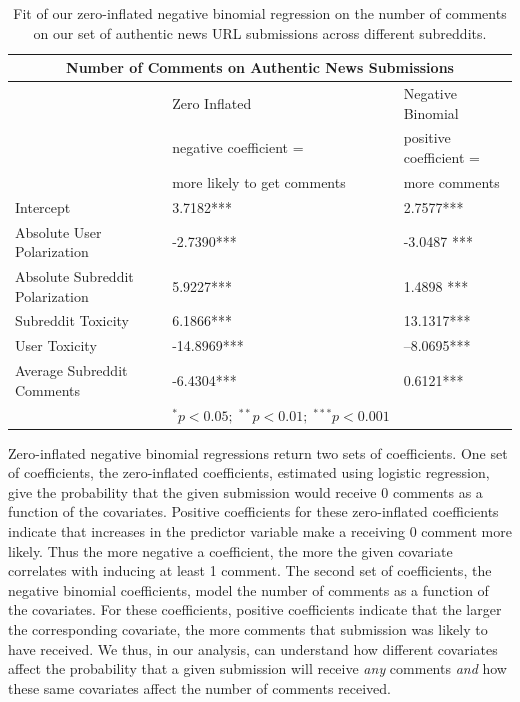 \begin{table}[b]
\centering
\begin{tabular}{lll}
\toprule
   \multicolumn{3}{c}{\large Number of Comments on Authentic News Submissions}          \\
   \toprule
                            & {Zero Inflated}  & {Negative Binomial }  \\
                      &       \footnotesize{negative coefficient = } &  \footnotesize{positive coefficient = }\\
                      &       \footnotesize{more likely to get comments} &  \footnotesize{more comments}\\
      \midrule
      Intercept              & 3.7182***  &2.7577*** \\               
      \midrule
     Absolute User Polarization               & -2.7390***  & -3.0487 ***  \\
      \midrule
      Absolute Subreddit Polarization              & 5.9227*** &1.4898 *** \\
    \midrule
      Subreddit Toxicity & 6.1866***  & 13.1317*** \\
      \midrule
       User Toxicity &   -14.8969*** &  --8.0695***\\
      \midrule
      Average Subreddit Comments &  -6.4304*** & 0.6121***  \\
\bottomrule
& $^\ast p<0.05; \;  ^{**} p<0.01; \; ^{***}p<0.001$ \\
\end{tabular}
\caption{Fit of our zero-inflated negative binomial regression on the number of comments on our set of authentic news URL submissions across different subreddits.} 
\label{tbl:mainstream-fit}
\end{table}
Zero-inflated negative binomial regressions return two sets of coefficients. One set of coefficients, the zero-inflated coefficients, estimated using logistic regression, give the probability that the given submission would receive 0 comments as a function of the covariates. Positive coefficients for these zero-inflated coefficients indicate that increases in the predictor variable make a receiving 0 comment more likely. Thus the more negative a coefficient, the more the given covariate correlates with inducing at least 1 comment. The second set of coefficients, the negative binomial coefficients, model the number of comments as a function of the covariates. For these coefficients, positive coefficients indicate that the larger the corresponding covariate, the more comments that submission was likely to have received.  We thus, in our analysis, can understand how different covariates affect the probability that a given submission will receive \textit{any} comments \emph{and} how these same covariates affect the number of comments received. 

